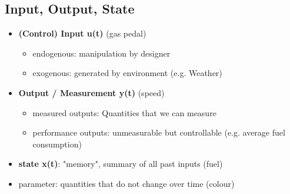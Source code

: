 \subsection{Input, Output, State}
    \begin{itemize}
        \item \textbf{(Control) Input u(t)} (gas pedal)
        \begin{itemize}
            \item endogenous: manipulation by designer
            \item exogenous: generated by environment (e.g. Weather)
        \end{itemize}
        \item \textbf{Output / Measurement y(t)} (speed)
        \begin{itemize}
            \item measured outputs: Quantities that we can measure
            \item performance outputs: unmeasurable but controllable (e.g. average fuel consumption)
        \end{itemize}
        \item \textbf{state x(t)}: "memory", summary of all past inputs (fuel)
        \item parameter: quantities that do not change over time (colour)
\end{itemize}